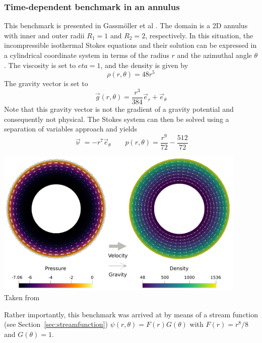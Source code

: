 \subsubsection{Time-dependent benchmark in an annulus}\label{sec:tdba}

This benchmark is presented in Gass{m\"o}ller et al \cite{galb19}.
The domain is a 2D annulus with inner and outer radii $R_1=1$ and $R_2=2$, respectively.
In this situation, the incompressible isothermal Stokes equations and their solution
can be expressed in a cylindrical coordinate system in terms of the radius $r$ and the
azimuthal angle $\theta$. The viscosity is set to $eta=1$, and the density is given by
\begin{equation}
\rho(r,\theta)=48r^5
\end{equation}
The gravity vector is set to 
\begin{equation}
\vec{g}(r,\theta)=\frac{r^3}{384} \vec{e}_r + \vec{e}_\theta
\end{equation}
Note that this gravity vector is not the gradient of a gravity potential
and consequently not physical.
The Stokes system can then be solved using a separation of variables
approach and yields
\begin{equation}
\vec{\upnu}=-r^7 \vec{e}_\theta
\quad\quad
p(r,\theta)=\frac{r^9}{72}-\frac{512}{72}
\end{equation}
\begin{center}
\includegraphics[width=12cm]{images/benchmark_annulus/galb19}\\
{\captionfont Taken from \cite{galb19}}
\end{center}
Rather importantly, this benchmark was arrived at by means of a stream function (see Section~\ref{sec:streamfunction}) 
$\psi(r,\theta)=F(r)G(\theta)$ with $F(r)=r^8/8$ and $G(\theta)=1$.


